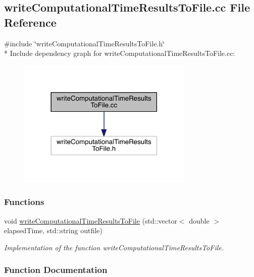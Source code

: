 \hypertarget{a00009}{}\subsection{write\+Computational\+Time\+Results\+To\+File.\+cc File Reference}
\label{a00009}
{\ttfamily \#include \char`\"{}write\+Computational\+Time\+Results\+To\+File.\+h\char`\"{}}\\*
Include dependency graph for write\+Computational\+Time\+Results\+To\+File.\+cc\+:
\nopagebreak
\begin{figure}[H]
\begin{center}
\leavevmode
\includegraphics[width=237pt]{a00019}
\end{center}
\end{figure}
\subsubsection*{Functions}
\begin{DoxyCompactItemize}
\item 
void \hyperlink{a00009_a006b80a1f9b722b42b808c5e38565fc7}{write\+Computational\+Time\+Results\+To\+File} (std\+::vector$<$ double $>$ elapsed\+Time, std\+::string outfile)
\begin{DoxyCompactList}\small\item\em Implementation of the function write\+Computational\+Time\+Results\+To\+File. \end{DoxyCompactList}\end{DoxyCompactItemize}


\subsubsection{Function Documentation}
\hypertarget{a00009_a006b80a1f9b722b42b808c5e38565fc7}{}
